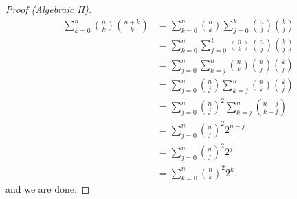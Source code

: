 \documentclass[12pt]{article}
\begin{document}
\newpage
\begin{proof}[Proof (Algebraic II)]
	\begin{align*}
		\sum^{n}_{k=0}\binom{n}{k}\binom{n+k}{k} & = \sum^{n}_{k=0}\binom{n}{k}\sum^{k}_{j=0}\binom{n}{j}\binom{k}{j}                       \\
		                                         & = \sum^{n}_{k=0}\sum^{k}_{j=0}\binom{n}{k}\binom{n}{j}\binom{k}{j}                       \\
		                                         & = \sum^{n}_{j=0}\sum^{n}_{k=j}\binom{n}{k}\binom{n}{j}\binom{k}{j} \tag{By lemma $\phi$} \\
		                                         & = \sum^{n}_{j=0}\binom{n}{j}\sum^{n}_{k=j}\binom{n}{k}\binom{k}{j}                       \\
		                                         & = \sum^{n}_{j=0}\binom{n}{j}^2\sum^{n}_{k=j}\binom{n-j}{k-j}                             \\
		                                         & = \sum^{n}_{j=0}\binom{n}{j}^2 2^{n-j}                                                   \\
		                                         & = \sum^{n}_{j=0}\binom{n}{j}^2 2^{j}                                                     \\
		                                         & = \sum^{n}_{k=0}\binom{n}{k}^2 2^{k},
	\end{align*}
	and we are done.
\end{proof}
\end{document}
